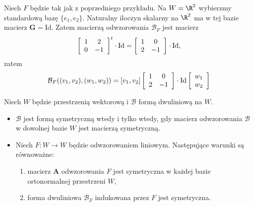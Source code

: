 \begin{frame}
 \begin{przyklad}
  Niech $F$ będzie tak jak z poprzedniego przykładu. Na $W=\R^2$ wybierzmy standardową bazę $\{e_1,e_2\}$. Naturalny iloczyn skalarny na $\R^2$ ma w tej bazie macierz $\mathbf{G}=\text{Id}$. Zatem macierzą odwzorowania $\mathcal{B}_F$ jest macierz
\[\left[\begin{array}{ c c }
1 & 2\\
0 & -1
\end{array}\right]^t\cdot\text{Id}=\left[\begin{array}{ c c }
1 & 0\\
2 & -1
\end{array}\right]\cdot\text{Id},\]
zatem
\[\mathcal{B}_F((v_1, v_2), (w_1,w_2)) =      
[v_1,v_2]\left[\begin{array}{ c c }
1 & 0\\
2 & -1
\end{array}\right]\cdot\text{Id}
\left[\begin{array}{c}
w_1 \\
w_2
\end{array}
\right]
\]
 \end{przyklad}

\end{frame}


\begin{frame}[<+->]


\begin{lemat}\label{lem:alg-lin-2}
Niech $W$ będzie przestrzenią wektorową i $\mathcal{B}$ formą dwuliniową na $W$.
\begin{itemize}
\item $\mathcal{B}$ jest formą symetryczną wtedy i tylko wtedy, gdy macierz odwzorowania $\mathcal{B}$ w \underline{}{dowolnej bazie $W$} jest macierzą symetryczną.
\item Niech $F\colon W\to W$ będzie odwzorowaniem liniowym. Następujące warunki są równoważne:
\begin{enumerate}
\item macierz $\mathbf{A}$ odwzorowania $F$ jest symetryczna w każdej bazie ortonormalnej przestrzeni $W$,
\item forma dwuliniowa $\mathcal{B}_F$ indukowana przez $F$ jest symetryczna.
\end{enumerate}

\end{itemize}
\end{lemat}

\end{frame}

